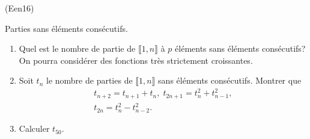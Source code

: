 \begin{tiny}(Een16)\end{tiny} Parties sans éléments consécutifs.
\begin{enumerate}
 \item Quel est le nombre de partie de $\llbracket 1,n \rrbracket$ à $p$ éléments sans éléments consécutifs? \newline
 On pourra considérer des fonctions \og très strictement croissantes\fg.
 \item Soit $t_n$ le nombre de parties de $\llbracket 1,n \rrbracket$ sans éléments consécutifs. Montrer que 
\begin{multline*}
 t_{n+2} = t_{n+1} +t_n, \; t_{2n+1} = t_{n}^2 + t_{n-1}^2, \\
 t_{2n} = t_{n}^2 - t_{n-2}^2.
\end{multline*}

 \item Calculer $t_{50}$.
\end{enumerate}
